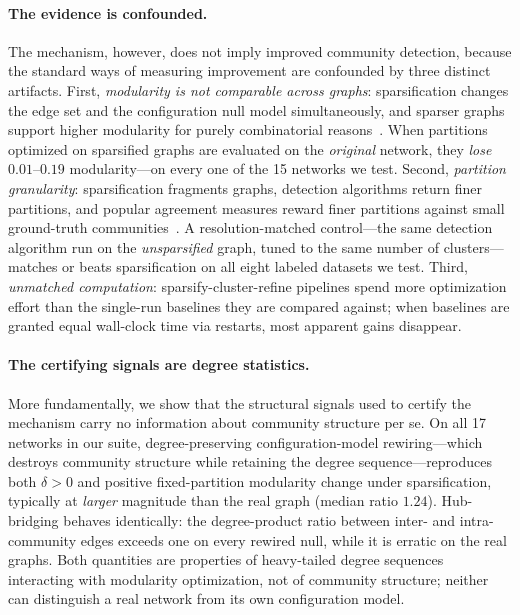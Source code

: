\paragraph{The evidence is confounded.}
The mechanism, however, does not imply improved community detection, because the standard ways of measuring improvement are confounded by three distinct artifacts.
First, \emph{modularity is not comparable across graphs}: sparsification changes the edge set and the configuration null model simultaneously, and sparser graphs support higher modularity for purely combinatorial reasons~\cite{guimera2004modularity}.
When partitions optimized on sparsified graphs are evaluated on the \emph{original} network, they \emph{lose} $0.01$--$0.19$ modularity---on every one of the 15 networks we test.
Second, \emph{partition granularity}: sparsification fragments graphs, detection algorithms return finer partitions, and popular agreement measures reward finer partitions against small ground-truth communities~\cite{vinh2010information}.
A resolution-matched control---the same detection algorithm run on the \emph{unsparsified} graph, tuned to the same number of clusters---matches or beats sparsification on all eight labeled datasets we test.
Third, \emph{unmatched computation}: sparsify-cluster-refine pipelines spend more optimization effort than the single-run baselines they are compared against; when baselines are granted equal wall-clock time via restarts, most apparent gains disappear.

\paragraph{The certifying signals are degree statistics.}
More fundamentally, we show that the structural signals used to certify the mechanism carry no information about community structure per se.
On all 17 networks in our suite, degree-preserving configuration-model rewiring---which destroys community structure while retaining the degree sequence---reproduces both $\delta > 0$ and positive fixed-partition modularity change under sparsification, typically at \emph{larger} magnitude than the real graph (median ratio $1.24$).
Hub-bridging behaves identically: the degree-product ratio between inter- and intra-community edges exceeds one on every rewired null, while it is erratic on the real graphs.
Both quantities are properties of heavy-tailed degree sequences interacting with modularity optimization, not of community structure; neither can distinguish a real network from its own configuration model.

